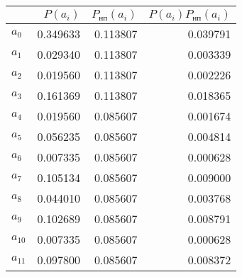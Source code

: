 \begin{tabular}{lrrr}
\toprule
 & $P(a_i)$ & $P_{\text{нп}}(a_i)$ & $P(a_i)P_{\text{нп}}(a_i)$ \\
\midrule
$a_{0}$ & 0.349633 & 0.113807 & 0.039791 \\
$a_{1}$ & 0.029340 & 0.113807 & 0.003339 \\
$a_{2}$ & 0.019560 & 0.113807 & 0.002226 \\
$a_{3}$ & 0.161369 & 0.113807 & 0.018365 \\
$a_{4}$ & 0.019560 & 0.085607 & 0.001674 \\
$a_{5}$ & 0.056235 & 0.085607 & 0.004814 \\
$a_{6}$ & 0.007335 & 0.085607 & 0.000628 \\
$a_{7}$ & 0.105134 & 0.085607 & 0.009000 \\
$a_{8}$ & 0.044010 & 0.085607 & 0.003768 \\
$a_{9}$ & 0.102689 & 0.085607 & 0.008791 \\
$a_{10}$ & 0.007335 & 0.085607 & 0.000628 \\
$a_{11}$ & 0.097800 & 0.085607 & 0.008372 \\
\bottomrule
\end{tabular}
